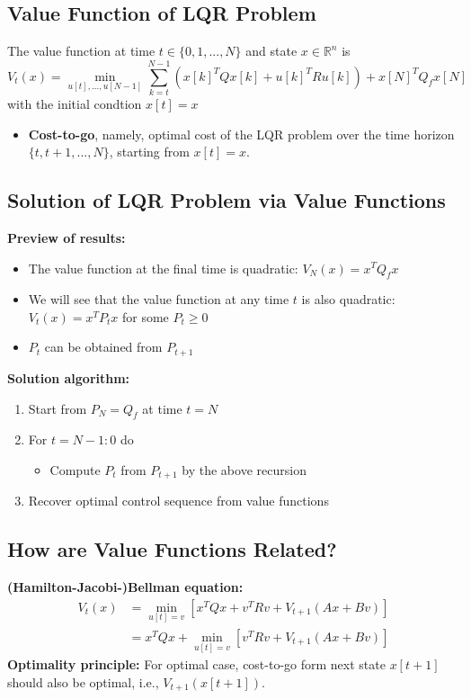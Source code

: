 \documentclass[10pt,a4paper,oneside]{article}
\begin{document}
\subsection{Value Function of LQR Problem}
The value function at time $t\in\{0,1,...,N\}$ and state $x\in\mathbb{R}^n$ is
\[
V_t(x)=\min_{u[t],...,u[N-1]}\sum_{k=t}^{N-1}(x[k]^TQx[k]+u[k]^TRu[k])+x[N]^TQ_fx[N]
\]
with the initial condtion $x[t]=x$
\begin{itemize}
	\item {\bfseries Cost-to-go}, namely, optimal cost of the LQR problem over the time horizon $\{t,t+1,...,N\}$, starting from $x[t]=x$.
\end{itemize}
\subsection{Solution of LQR Problem via Value Functions}
{\bfseries Preview of results:}
\begin{itemize}
	\item The value function at the final time is quadratic: $V_N(x)=x^TQ_fx$
	\item We will see that the value function at any time $t$ is also quadratic: $V_t(x)=x^TP_tx$ for some $P_t\geqslant0$
	\item $P_t$ can be obtained from $P_{t+1}$
\end{itemize}
{\bfseries Solution algorithm:}
\begin{enumerate}[(1)]
	\item Start from $P_N=Q_f$ at time $t=N$
	\item For $t=N-1:0$ do
	\begin{itemize}
		\item Compute $P_t$ from $P_{t+1}$ by the above recursion
	\end{itemize}
	\item Recover optimal control sequence from value functions
\end{enumerate}
\subsection{How are Value Functions Related?}
{\bfseries (Hamilton-Jacobi-)Bellman equation:}
$$
\begin{aligned}
V_t(x)&=\min_{u[t]=v}[x^TQx+v^TRv+V_{t+1}(Ax+Bv)]\\&=x^TQx+\min_{u[t]=v}[v^TRv+V_{t+1}(Ax+Bv)]
\end{aligned}
$$
{\bfseries Optimality principle: }For optimal case, cost-to-go form next state $x[t+1]$ should also be optimal, i.e., $V_{t+1}(x[t+1])$.
\end{document}
